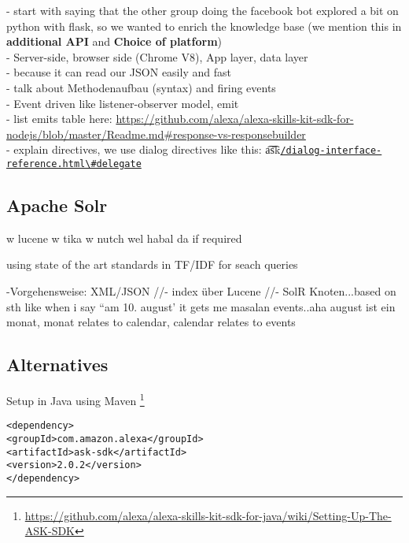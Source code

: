 	- start with saying that the other group doing the facebook bot explored a bit on python with flask, so we wanted to enrich the knowledge base (we mention this in \textbf{additional API }and \textbf{Choice of platform})\\
	- Server-side, browser side (Chrome V8), App layer, data layer\\
	- because it can read our JSON easily and fast\\
	- talk about Methodenaufbau (syntax) and firing events\\
	- Event driven like listener-observer model, emit\\
	- list emits table here: \url{https://github.com/alexa/alexa-skills-kit-sdk-for-nodejs/blob/master/Readme.md#response-vs-responsebuilder}\\
	- explain directives, we use dialog directives like this: \t{a\t{sk}}\href{https://developer.amazon.com/docs/custom-skills/dialog-interface-reference.html\#delegate}{\lstinline|/dialog-interface-reference.html\#delegate|}	



\subsection*{Apache Solr}
w lucene w tika w nutch wel habal da if required

using state of the art standards in TF/IDF for seach queries

-Vorgehensweise: XML/JSON //- index über Lucene //- SolR Knoten...based on sth like when i say  ``am 10. august'  it gets me masalan events..aha august ist ein monat, monat relates to calendar, calendar relates to events





\subsection*{Alternatives}
Setup in Java using Maven \footnote{\url{https://github.com/alexa/alexa-skills-kit-sdk-for-java/wiki/Setting-Up-The-ASK-SDK}}

\begin{verbatim}
<dependency>
<groupId>com.amazon.alexa</groupId>
<artifactId>ask-sdk</artifactId>
<version>2.0.2</version>
</dependency>
\end{verbatim}

